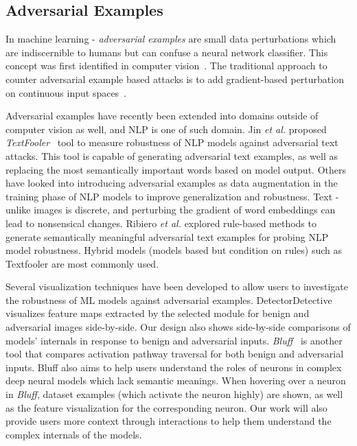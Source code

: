 \documentclass[journal]{vgtc}                %
\begin{document}
\subsection{Adversarial Examples}
In machine learning - \textit{adversarial examples} are small data perturbations which are indiscernible to humans but can confuse a neural network classifier. This concept was first identified in computer vision~\cite{Goodfellow2015ExplainingAH,DBLP:journals/corr/KurakinGB16,labacacastro2021universal}. The traditional approach to counter adversarial example based attacks is to add gradient-based perturbation on continuous input spaces~\cite{Goodfellow2015ExplainingAH,DBLP:journals/corr/KurakinGB16}. 

Adversarial examples have recently been extended into domains outside of computer vision as well, and NLP is one of such domain.  Jin \MakeLowercase{\textit{et al.}} proposed \textit{TextFooler}~\cite{jin2019bert} tool to measure robustness of NLP models against adversarial text attacks. This tool is capable of generating adversarial text examples, as well as replacing the most semantically important words based on model output. Others~\cite{zhu2020freelb,ghaddar2021context,ghaddar-etal-2021-end,rashid-etal-2021-mate} have looked into introducing adversarial examples as data augmentation in the training phase of NLP models to improve generalization and robustness. Text - unlike images is discrete, and perturbing the gradient of word embeddings can lead to nonsensical changes. Ribiero \MakeLowercase{\textit{et al.}} explored rule-based methods to generate semantically meaningful adversarial text examples for probing NLP model robustness.  Hybrid models (models based but condition on rules) such as Textfooler are most commonly used. 


Several visualization techniques have been developed to allow users to investigate the robustness of ML models against adversarial examples. DetectorDetective ~\cite{DetectorDetective} visualizes feature maps extracted by the selected module for benign and adversarial images side-by-side. Our design also shows side-by-side comparisons of models' internals in response to benign and adversarial inputs. \textit{Bluff}~\cite{Bluff} is another tool that compares activation pathway traversal for both benign and adversarial inputs. Bluff also aims to help users understand the roles of neurons in complex deep neural models which lack semantic meanings. When hovering over a neuron in \textit{Bluff}, dataset examples (which activate the neuron highly) are shown, as well as the feature visualization for the corresponding neuron. Our work will also provide users more context through interactions to help them understand the complex internals of the models.
\end{document}
